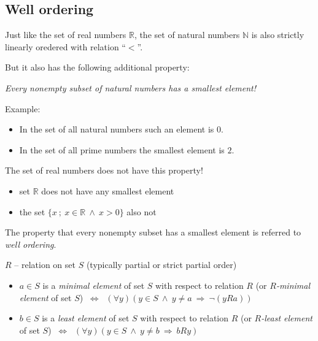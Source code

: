 \documentclass[11pt,paper=b5,footinclude,headinclude]{scrbook} %
\def\inn {{~\wedge~}}
\def\sledi {{~\Rightarrow~}}
\def\cee {{~\Leftrightarrow~}}
\theoremstyle{remark}
\theoremstyle{definition} %
\theoremstyle{theorem} %
\begin{document}
%
%
%
%
%
%
%
%



\subsection{Well ordering}

Just like the set of real numbers $\mathbb{R}$, the set of natural numbers $\mathbb{N}$
is also strictly linearly oredered with relation ``$<$''.

But it also has the following additional property:

{\em Every nonempty subset of natural numbers has a smallest element!}

Example:
\begin{itemize}
 \item In the set of all natural numbers such an element is $0$.
  \item In the set of all prime numbers the smallest element is $2$.
\end{itemize}

The set of real numbers does not have this property!
\begin{itemize}
  \item set $\mathbb{R}$ does not have any smallest element
  \item the set $\{x~;~x\in \mathbb{R} \inn x> 0\}$ also not
\end{itemize}

\bigskip
The property that every nonempty subset has a smallest element is referred to {\em well ordering}.

\bigskip
$R$ -- relation  on set  $S$ (typically partial or strict partial order)
\begin{itemize}
  \item $a\in S$ is a {\em minimal element} of set  $S$ with respect to relation $R$ (or {\em $R$-minimal element} of set $S$) $\cee$ $(\forall y)(y\in S\inn y\neq a\sledi \neg (yRa))$
  \item $b\in S$ is a {\em least element} of set $S$ with respect to relation $R$ (or {\em $R$-least element} of set $S$) $\cee$ $(\forall y)(y\in S\inn y\neq b\sledi bRy)$
\end{itemize}
\end{document}
